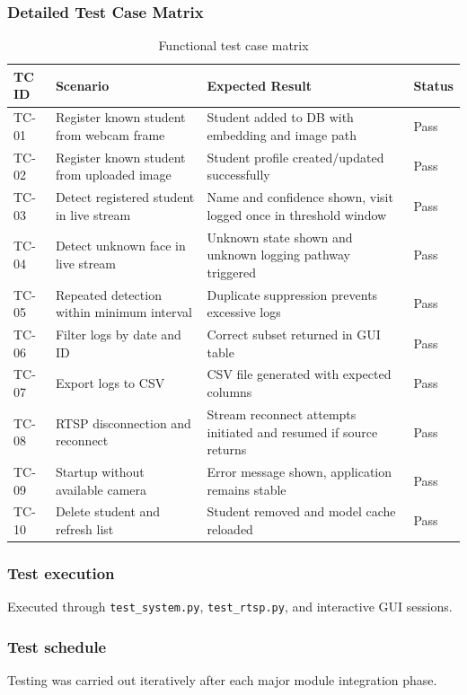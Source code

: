 \documentclass{fisatprojectfinal}
\begin{document}
\subsubsection*{Detailed Test Case Matrix}
\begin{table}[h!]
\centering
\caption{Functional test case matrix}
\begin{tabular}{|p{1.2cm}|p{4.2cm}|p{4.0cm}|p{3.6cm}|}
\hline
TC ID & Scenario & Expected Result & Status \\
\hline
TC-01 & Register known student from webcam frame & Student added to DB with embedding and image path & Pass \\
\hline
TC-02 & Register known student from uploaded image & Student profile created/updated successfully & Pass \\
\hline
TC-03 & Detect registered student in live stream & Name and confidence shown, visit logged once in threshold window & Pass \\
\hline
TC-04 & Detect unknown face in live stream & Unknown state shown and unknown logging pathway triggered & Pass \\
\hline
TC-05 & Repeated detection within minimum interval & Duplicate suppression prevents excessive logs & Pass \\
\hline
TC-06 & Filter logs by date and ID & Correct subset returned in GUI table & Pass \\
\hline
TC-07 & Export logs to CSV & CSV file generated with expected columns & Pass \\
\hline
TC-08 & RTSP disconnection and reconnect & Stream reconnect attempts initiated and resumed if source returns & Pass \\
\hline
TC-09 & Startup without available camera & Error message shown, application remains stable & Pass \\
\hline
TC-10 & Delete student and refresh list & Student removed and model cache reloaded & Pass \\
\hline
\end{tabular}
\end{table}

\subsubsection*{Test execution}
Executed through \texttt{test\_system.py}, \texttt{test\_rtsp.py}, and interactive GUI sessions.

\subsubsection*{Test schedule}
Testing was carried out iteratively after each major module integration phase.
\end{document}
